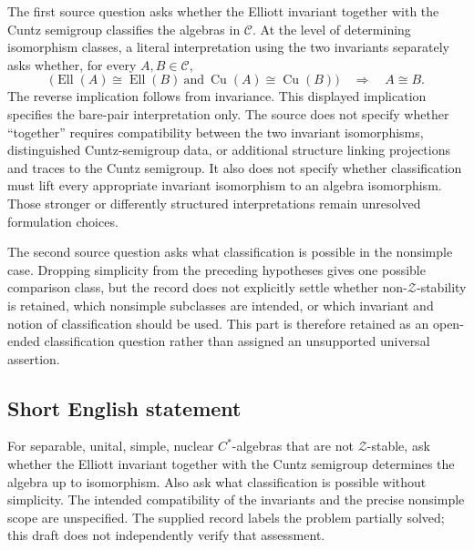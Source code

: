 \documentclass[11pt]{article}
\begin{document}
The first source question asks whether the Elliott invariant together with the Cuntz semigroup classifies the algebras in \(\mathscr C\). At the level of determining isomorphism classes, a literal interpretation using the two invariants separately asks whether, for every \(A,B\in\mathscr C\),
\[
\bigl(\operatorname{Ell}(A)\cong\operatorname{Ell}(B)\ \text{and}\ \operatorname{Cu}(A)\cong\operatorname{Cu}(B)\bigr)
\quad\Longrightarrow\quad A\cong B.
\]
The reverse implication follows from invariance. This displayed implication specifies the bare-pair interpretation only. The source does not specify whether ``together'' requires compatibility between the two invariant isomorphisms, distinguished Cuntz-semigroup data, or additional structure linking projections and traces to the Cuntz semigroup. It also does not specify whether classification must lift every appropriate invariant isomorphism to an algebra isomorphism. Those stronger or differently structured interpretations remain unresolved formulation choices.

The second source question asks what classification is possible in the nonsimple case. Dropping simplicity from the preceding hypotheses gives one possible comparison class, but the record does not explicitly settle whether non-\(\mathcal Z\)-stability is retained, which nonsimple subclasses are intended, or which invariant and notion of classification should be used. This part is therefore retained as an open-ended classification question rather than assigned an unsupported universal assertion.
\subsection{Short English statement}
For separable, unital, simple, nuclear \(C^*\)-algebras that are not \(\mathcal Z\)-stable, ask whether the Elliott invariant together with the Cuntz semigroup determines the algebra up to isomorphism. Also ask what classification is possible without simplicity. The intended compatibility of the invariants and the precise nonsimple scope are unspecified. The supplied record labels the problem partially solved; this draft does not independently verify that assessment.
\end{document}
